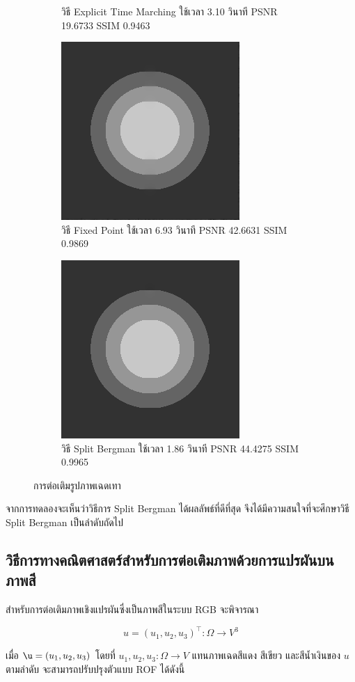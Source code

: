 \documentclass[hidelinks,a4paper,14pt]{article}
\numberwithin{equation}{section}							%
\begin{document}
{\begin{figure}[H]
\begin{subfigure}{0.3\linewidth}
		\caption{วิธี Explicit Time Marching ใช้เวลา 3.10 วินาที PSNR 19.6733 SSIM 0.9463}
	\end{subfigure}
	\begin{subfigure}{0.3\linewidth}
		\centering
		\includegraphics[width=0.3\linewidth]{images/grayscale_inpaint/result_fixpoint.png}
		\caption{วิธี Fixed Point ใช้เวลา 6.93 วินาที PSNR 42.6631 SSIM 0.9869}
	\end{subfigure}
	\begin{subfigure}{0.3\linewidth}
		\centering
		\includegraphics[width=0.3\linewidth]{images/grayscale_inpaint/result_splitbergman.png}
		\caption{วิธี Split Bergman ใช้เวลา 1.86 วินาที PSNR 44.4275 SSIM 0.9965}
	\end{subfigure}
	\caption{การต่อเติมรูปภาพเฉดเทา}
	\label{image:inpaint-grayscale}
\end{figure}

	\hspace{1cm}จากการทดลองจะเห็นว่าวิธีการ Split Bergman ได้ผลลัพธ์ที่ดีที่สุด จึงได้มีความสนใจที่จะศึกษาวิธี Split Bergman เป็นลำดับถัดไป



\subsection{วิธีการทางคณิตศาสตร์สำหรับการต่อเติมภาพด้วยการแปรผันบนภาพสี} 

สำหรับการต่อเติมภาพเชิงแปรผันซึ่งเป็นภาพสีในระบบ RGB จะพิจารณา

$$ u = (u_1,u_2,u_3)^{\top} : \Omega  \rightarrow V^3 $$

\noindent เมื่อ $\u=(u_1,u_2,u_3)$ โดยที่ $u_1,u_2,u_3: \Omega  \rightarrow V$ แทนภาพเฉดสีแดง สีเขียว และสีน้ำเงินของ $u$ ตามลำดับ จะสามารถปรับปรุงตัวแบบ ROF ได้ดังนี้

}
\end{document}
